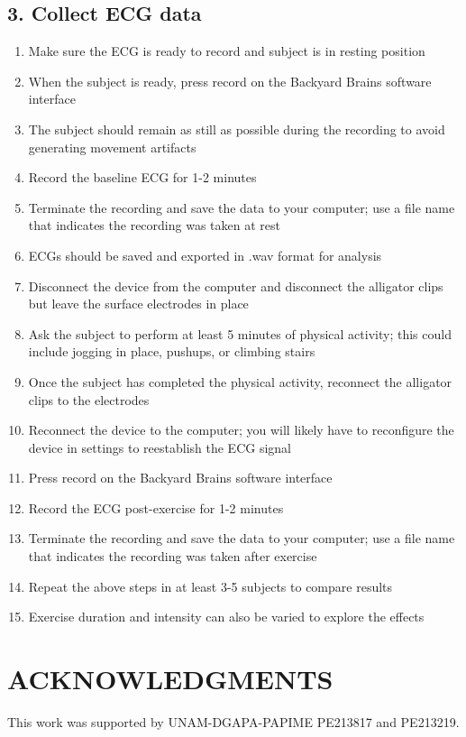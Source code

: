 \documentclass[12pt]{article}
\begin{document}
\subsection*{3. Collect ECG data}
\begin{enumerate}
\item Make sure the ECG is ready to record and subject is in resting position
\item When the subject is ready, press record on the Backyard Brains software interface
\item The subject should remain as still as possible during the recording to avoid generating movement artifacts
\item Record the baseline ECG for 1-2 minutes
\item Terminate the recording and save the data to your computer; use a file name that indicates the recording was taken at rest
\item ECGs should be saved and exported in .wav format for analysis
\item Disconnect the device from the computer and disconnect the alligator clips but leave the surface electrodes in place
\item Ask the subject to perform at least 5 minutes of physical activity; this could include jogging in place, pushups, or climbing stairs   
\item Once the subject has completed the physical activity, reconnect the alligator clips to the electrodes
\item Reconnect the device to the computer; you will likely have to reconfigure the device in settings to reestablish the ECG signal
\item Press record on the Backyard Brains software interface
\item Record the ECG post-exercise for 1-2 minutes
\item Terminate the recording and save the data to your computer; use a file name that indicates the recording was taken after exercise
\item Repeat the above steps in at least 3-5 subjects to compare results
\item Exercise duration and intensity can also be varied to explore the effects
\end{enumerate}

\section*{ACKNOWLEDGMENTS}
This work was supported by UNAM-DGAPA-PAPIME PE213817 and PE213219.

\renewcommand\refname{REFERENCES}
\renewcommand{\markboth}[2]{}%
\begin{footnotesize}

\end{footnotesize}
\end{document}
